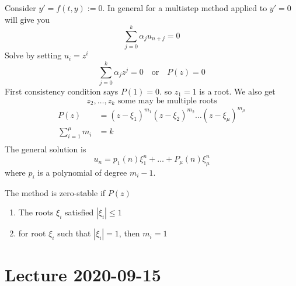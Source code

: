\documentclass{article}
\theoremstyle{remark}
\newcommand{\newpara}
  {
  \vskip 0.4cm
  }
\begin{document}
\newpara
Consider $y'  = f\left( t,y \right) := 0$.  In general for a multistep method applied to $y'  = 0$ will give you \[
\sum_{j=0}^{k}  \alpha _{j} u_{n+j} = 0
\] 
Solve by setting $u_{i} = z^{i}$ \[
\sum_{j=0}^{k} \alpha _{j} z^{j} = 0 \quad \text{or}\quad  P\left( z \right) = 0  
\] 
First consistency condition says $P\left( 1 \right) = 0$.  so $z_{1} = 1$ is a root. We also get \[
z_{2} , \ldots , z_{k}  \text{ some may be multiple roots}
\] 
\[
  \begin{split}
  P\left( z \right)  & = \left( z- \xi _{1} \right)^{m_{1}} \left( z - \xi _{2} \right)^{m_{2}} \ldots \left( z - \xi _{\mu } \right) ^{ m_{\mu }} \\
  \sum_{i=1}^{\mu }  m_{i} &=  k \\
  \end{split} 
\] 
The general solution is \[
u_{n} = p_{1} \left( n \right) \xi ^{n}_{1} + \ldots + P _{\mu }\left( n \right) \xi ^{n}_{\mu }
\] 
where $p_{i}$ is a polynomial of degree $m_{i} -1$.

\begin{definition}
  The method is zero-stable  if $ P\left( z \right) $  
  \begin{enumerate}[label=(\roman*)]
    \item The roots $\xi _{i}$ satisfied $\left\lvert \xi _{i} \right\rvert  \le 1$
    \item for root $\xi _{i}$ such that $\left\lvert \xi _{i} \right\rvert  = 1$, then $m_{i} = 1$
  \end{enumerate}
\end{definition}


\newpage
\section{Lecture 2020-09-15}%
\label{sec:lecture_2020_09_15a}
\end{document}
